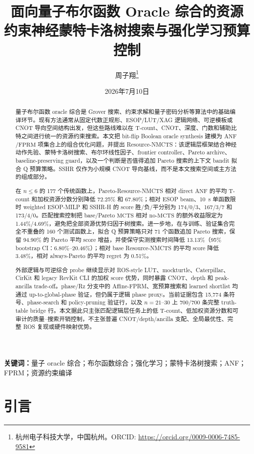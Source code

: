 \documentclass[UTF8,fontset=fandol,11pt]{ctexart}
\title{面向量子布尔函数 Oracle 综合的资源约束神经蒙特卡洛树搜索与强化学习预算控制}
\author{周子翔\thanks{杭州电子科技大学，中国杭州。ORCID: \url{https://orcid.org/0009-0006-7485-9581}}}
\date{2026年7月10日}
\newcommand{\method}{Resource-NMCTS}
\newcommand{\anf}{\ensuremath{\mathrm{ANF}}}
\newcommand{\fprm}{\ensuremath{\mathrm{FPRM}}}
\newcommand{\mcts}{\ensuremath{\mathrm{MCTS}}}
\begin{document}
\pagestyle{plain}
\maketitle

\begin{abstract}
量子布尔函数 oracle 综合是 Grover 搜索、约束求解和量子密码分析等算法中的基础编译环节。现有方法通常从固定代数正规形、ESOP/LUT/XAG 逻辑网络、可逆模板或 CNOT 导向空间结构出发，但这些路线难以在 T-count、CNOT、深度、门数和辅助比特之间进行统一的资源约束搜索。本文把 bit-flip Boolean oracle synthesis 建模为 \anf{}/\fprm{} 项集合上的组合优化问题，并提出 \method{}：该逻辑层框架结合神经动作先验、蒙特卡洛树搜索、布尔环线性因子、frontier controller、Pareto archive、baseline-preserving guard，以及一个判断是否值得追加 Pareto 搜索的上下文 bandit 拟合 Q 预算策略。SSHR 仅作为小规模 CNOT 导向基线，而不是本文搜索空间或主方法的组成部分。

在 $n\leq6$ 的 177 个传统函数上，Pareto-\method{} 相对 direct \anf{} 的平均 T-count 和加权资源分数分别降低 72.25\% 和 67.80\%；相对 ESOP beam、10~s 单函数限时 weighted ESOP-MILP 和 SSHR-H 的 score 胜/负/平分别为 174/0/3、167/3/7 和 173/4/0。匹配搜索控制把 base/Pareto \mcts{} 相对 no-\mcts{} 的额外收益限定为 1.44\%/4.69\%，避免把全部资源优势归因于树搜索。进一步地，在与训练、验证集合完全不重叠的 160 个测试函数上，拟合 Q 预算策略只对 71 个函数追加 Pareto 搜索，保留 94.90\% 的 Pareto 平均 score 增益，并使保守实测搜索时间降低 13.13\%（95\% bootstrap CI：6.80\%--20.46\%）；相对 base \method{} 的平均 score 降低 3.48\%，相对 always-Pareto 的平均 regret 为 0.51\%。

外部逻辑与可逆综合 probe 继续显示对 ROS-style LUT、mockturtle、Caterpillar、CirKit 和 legacy RevKit CLI 的加权 score 优势，同时暴露 CNOT、depth 和 peak-ancilla trade-off。phase/Rz 分支中的 Affine-FPRM、宽预算搜索和 learned shortlist 均通过 up-to-global-phase 验证，但仍属于逻辑 phase proxy。当前证据包含 15,774 条符号、phase-search 和 policy-pruning 验证行，以及 $n=21$--$30$ 上 700/700 条完整 truth-table bridge 行。本文据此只主张匹配逻辑层任务上的低 T-count、低加权资源分数和可审计的质量--搜索开销控制，不主张普遍 CNOT/depth/ancilla 支配、全局最优性、完整 ROS 复现或硬件映射优势。
\end{abstract}

\noindent\textbf{关键词：}量子 oracle 综合；布尔函数综合；强化学习；蒙特卡洛树搜索；ANF；FPRM；资源约束编译

\section{引言}
\end{document}
